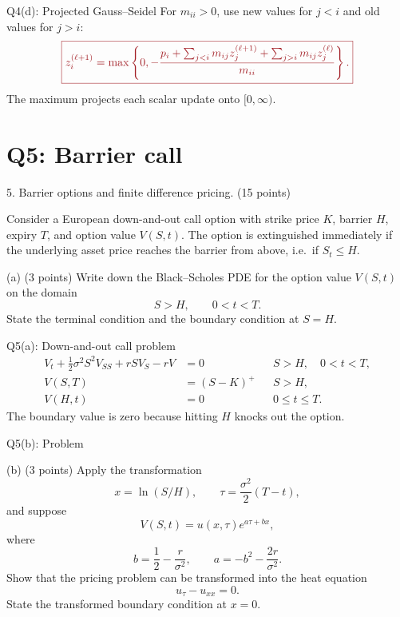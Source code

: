 \documentclass{beamer}
\newcommand{\keymath}[1]{\textcolor{lecturekey}{#1}}
\newcommand{\keybox}[1]{\keymath{\boxed{#1}}}
\begin{document}
\begin{frame}{Q4(d): Projected Gauss--Seidel}
\small
For $m_{ii}>0$, use new values for $j<i$ and old values for $j>i$:
\[
\keybox{z_i^{(\ell+1)}=
\max\left\{0,-\frac{p_i+
\sum_{j<i}m_{ij}z_j^{(\ell+1)}+
\sum_{j>i}m_{ij}z_j^{(\ell)}}{m_{ii}}\right\}.}
\]
The maximum projects each scalar update onto $[0,\infty)$.
\end{frame}

\section{Q5: Barrier call}

\begin{frame}{5. Barrier options and finite difference pricing.}
\footnotesize
\setlength{\abovedisplayskip}{5pt}
\setlength{\belowdisplayskip}{5pt}
\hfill (15 points)\par
Consider a European down-and-out call option with strike price $K$, barrier $H$,
expiry $T$, and option value $V(S,t)$. The option is extinguished immediately if the
underlying asset price reaches the barrier from above, i.e.\ if $S_t\leq H$.
\begin{block}{(a) \hfill (3 points)}
Write down the Black--Scholes PDE for the option value $V(S,t)$ on the domain
\[
S>H,\qquad 0<t<T.
\]
State the terminal condition and the boundary condition at $S=H$.
\end{block}
\end{frame}

\begin{frame}{Q5(a): Down-and-out call problem}
\small
\begin{align*}
V_t+\tfrac12\sigma^2S^2V_{SS}+rSV_S-rV&=0
&&S>H,\quad 0<t<T,\\
V(S,T)&=(S-K)^+ &&S>H,\\
V(H,t)&=0 &&0\leq t\leq T.
\end{align*}
The boundary value is zero because hitting $H$ knocks out the option.
\end{frame}

\begin{frame}{Q5(b): Problem}
\footnotesize
\setlength{\abovedisplayskip}{5pt}
\setlength{\belowdisplayskip}{5pt}
\begin{block}{(b) \hfill (3 points)}
Apply the transformation
\[
x=\ln(S/H),\qquad \tau=\frac{\sigma^2}{2}(T-t),
\]
and suppose
\[
V(S,t)=u(x,\tau)e^{a\tau+bx},
\]
where
\[
b=\frac12-\frac{r}{\sigma^2},\qquad a=-b^2-\frac{2r}{\sigma^2}.
\]
Show that the pricing problem can be transformed into the heat equation
\[
u_\tau-u_{xx}=0.
\]
State the transformed boundary condition at $x=0$.
\end{block}
\end{frame}
\end{document}
